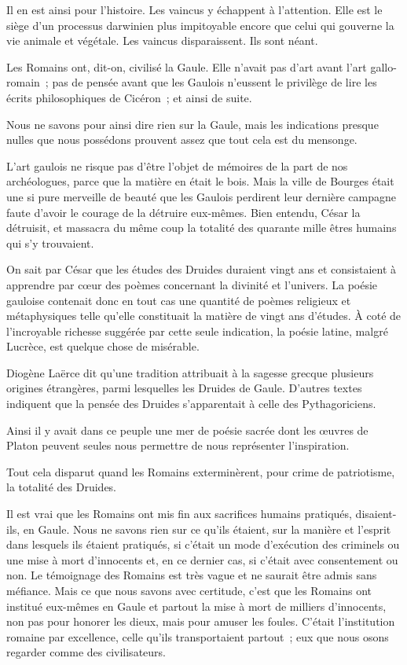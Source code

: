 \documentclass[french,twoside]{book} %
\begin{document}
Il en est ainsi pour l'histoire. Les vaincus y échappent à l'attention. Elle est le siège d'un processus darwinien plus impitoyable encore que celui qui gouverne la vie animale et végétale. Les vaincus disparaissent. Ils sont néant.\par
Les Romains ont, dit-on, civilisé la Gaule. Elle n'avait pas d'art avant l'art gallo-romain ; pas de pensée avant que les Gaulois n'eussent le privilège de lire les écrits philosophiques de Cicéron ; et ainsi de suite.\par
Nous ne savons pour ainsi dire rien sur la Gaule, mais les indications presque nulles que nous possédons prouvent assez que tout cela est du mensonge.\par
L'art gaulois ne risque pas d'être l'objet de mémoires de la part de nos archéologues, parce que la matière en était le bois. Mais la ville de Bourges était une si pure merveille de beauté que les Gaulois perdirent leur dernière campagne faute d'avoir le courage de la détruire eux-mêmes. Bien entendu, César la détruisit, et massacra du même coup la totalité des quarante mille êtres humains qui s'y trouvaient.\par
On sait par César que les études des Druides duraient vingt ans et consistaient à apprendre par cœur des poèmes concernant la divinité et l'univers. La poésie gauloise contenait donc en tout cas une quantité de poèmes religieux et métaphysiques telle qu'elle constituait la matière de vingt ans d'études. À coté de l'incroyable richesse suggérée par cette seule indication, la poésie latine, malgré Lucrèce, est quelque chose de misérable.\par
Diogène Laërce dit qu'une tradition attribuait à la sagesse grecque plusieurs origines étrangères, parmi lesquelles les Druides de Gaule. D'autres textes indiquent que la pensée des Druides s'apparentait à celle des Pythagoriciens.\par
Ainsi il y avait dans ce peuple une mer de poésie sacrée dont les œuvres de Platon peuvent seules nous permettre de nous représenter l'inspiration.\par
Tout cela disparut quand les Romains exterminèrent, pour crime de patriotisme, la totalité des Druides.\par
Il est vrai que les Romains ont mis fin aux sacrifices humains pratiqués, disaient-ils, en Gaule. Nous ne savons rien sur ce qu'ils étaient, sur la manière et l'esprit dans lesquels ils étaient pratiqués, si c'était un mode d'exécution des criminels ou une mise à mort d'innocents et, en ce dernier cas, si c'était avec consentement ou non. Le témoignage des Romains est très vague et ne saurait être admis sans méfiance. Mais ce que nous savons avec certitude, c'est que les Romains ont institué eux-mêmes en Gaule et partout la mise à mort de milliers d'innocents, non pas pour honorer les dieux, mais pour amuser les foules. C'était l'institution romaine par excellence, celle qu'ils transportaient partout ; eux que nous osons regarder comme des civilisateurs.\par
\end{document}
